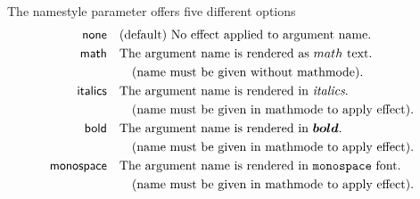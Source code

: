 \documentclass{article}
\begin{document}
    The \textsf{namestyle} parameter offers five different options
    \begin{align*}
        \mathsf{none} &\quad \text{(default) No effect applied to argument name.}\\
        \mathsf{math} &\quad \text{The argument name is rendered as $math$ text.}\\
        &\quad\quad \text{(name must be given without mathmode).}\\
        \mathsf{italics} &\quad \text{The argument name is rendered in \textit{italics}.}\\
        &\quad\quad \text{(name must be given in mathmode to apply effect).}\\
        \mathsf{bold} &\quad \text{The argument name is rendered in $\boldsymbol{bold}$.}\\
        &\quad\quad \text{(name must be given in mathmode to apply effect).}\\
        \mathsf{monospace} &\quad \text{The argument name is rendered in \texttt{monospace} font.}\\
        &\quad\quad \text{(name must be given in mathmode to apply effect).}\\
    \end{align*}
\end{document}
